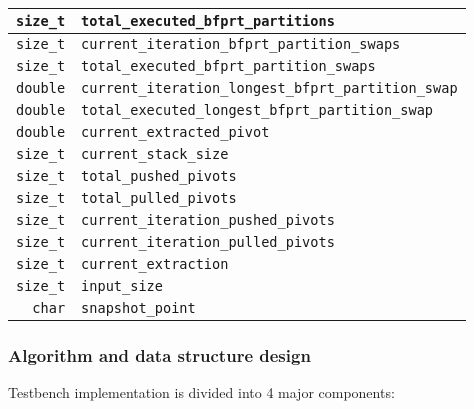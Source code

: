 \begin{tabularx}{\linewidth}{|r|X|}
    \hline
    \texttt{size\_t} & \texttt{total\_executed\_bfprt\_partitions} \\ %
    \hline
    \texttt{size\_t} & \texttt{current\_iteration\_bfprt\_partition\_swaps} \\ %
    \hline
    \texttt{size\_t} & \texttt{total\_executed\_bfprt\_partition\_swaps} \\ %
    \hline
    \texttt{double} & \texttt{current\_iteration\_longest\_bfprt\_partition\_swap} \\ %
    \hline
    \texttt{double} & \texttt{total\_executed\_longest\_bfprt\_partition\_swap} \\ %
    \hline
    \texttt{double} & \texttt{current\_extracted\_pivot} \\ %
    \hline
    \texttt{size\_t} & \texttt{current\_stack\_size} \\ %
    \hline
    \texttt{size\_t} & \texttt{total\_pushed\_pivots} \\ %
    \hline
    \texttt{size\_t} & \texttt{total\_pulled\_pivots} \\ %
    \hline
    \texttt{size\_t} & \texttt{current\_iteration\_pushed\_pivots} \\ %
    \hline
    \texttt{size\_t} & \texttt{current\_iteration\_pulled\_pivots} \\ %
    \hline
    \texttt{size\_t} & \texttt{current\_extraction} \\ %
    \hline
    \texttt{size\_t} & \texttt{input\_size} \\ %
    \hline
    \texttt{char} & \texttt{snapshot\_point} \\ %
    \hline
\end{tabularx}

\subsubsection{Algorithm and data structure design}
Testbench implementation is divided into 4 major components:

